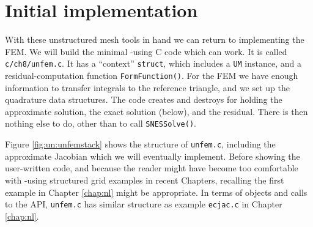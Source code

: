

\section{Initial implementation}

With these unstructured mesh tools in hand we can return to implementing the FEM.  We will build the minimal \pSNES-using C code which can work.  It is called \texttt{c/ch8/unfem.c}.  It has a ``context'' \texttt{struct}, which includes a \texttt{UM} instance, and a residual-computation function \texttt{FormFunction()}.  For the FEM we have enough information to transfer integrals to the reference triangle, and we set up the quadrature data structures.  The code creates and destroys \pVecs for holding the approximate solution, the exact solution (below), and the residual.  There is then nothing else to do, other than to call \texttt{SNESSolve()}.

Figure \ref{fig:un:unfemstack} shows the structure of \texttt{unfem.c}, including the approximate Jacobian which we will eventually implement.  Before showing the user-written code, and because the reader might have become too comfortable with \pDMDA-using structured grid examples in recent Chapters, recalling the first example in Chapter \ref{chap:nl} might be appropriate.  In terms of \PETSc objects and calls to the \PETSc API, \texttt{unfem.c} has similar structure as example \texttt{ecjac.c} in Chapter \ref{chap:nl}.


